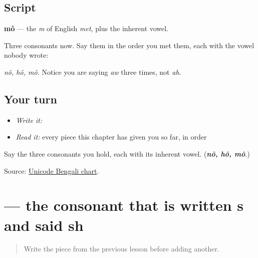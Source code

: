 \subsection*{Script}

\begin{quote}
\end{quote}

\textbf{mô} — the \emph{m} of English \emph{met}, plus the inherent vowel.

Three consonants now. Say them in the order you met them, each with the vowel nobody wrote:

\begin{quote}
\textbf{}  \textbf{}  \textbf{}
\end{quote}

\emph{nô, hô, mô.} Notice you are saying \emph{aw} three times, not \emph{ah}.

\subsection*{Your turn}
\begin{itemize}
\raggedright
  \item \emph{Write it:} 
  \item \emph{Read it:} every piece this chapter has given you so far, in order
\end{itemize}

\begin{tcolorbox}[breakable,colback=teal!4,colframe=teal!35!black,title={Before you move on}]
Say the three consonants you hold, each with its inherent vowel. (\emph{\textbf{nô, hô, mô}}.)

Source: \href{https://www.unicode.org/charts/PDF/U0980.pdf}{Unicode Bengali chart}.
\end{tcolorbox}
\section[\texorpdfstring{\bn{স} (shô)}{স (shô)}]{ — the consonant that is written s and said sh}

\label{lesson:BN-W01-sa}



\begin{quote}
Write the piece from the previous lesson before adding another.
\end{quote}

